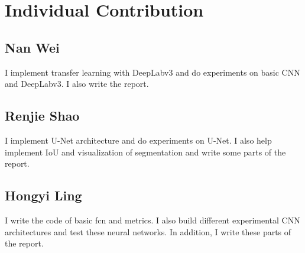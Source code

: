 \documentclass{article} %
\begin{document}
\section{Individual Contribution}

\subsection*{Nan Wei}
I implement transfer learning with DeepLabv3 and do experiments on basic CNN and DeepLabv3. I also write the report.

\subsection*{Renjie Shao}
I implement U-Net architecture and do experiments on U-Net. I also help implement IoU and visualization of segmentation and write some parts of the report.
\subsection*{Hongyi Ling}
I write the code of basic fcn and metrics. I also build different experimental CNN architectures and test these neural networks. In addition, I write these parts of the report.



\end{document}
